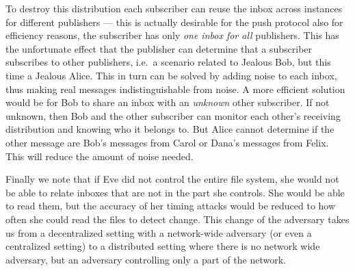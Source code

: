 To destroy this distribution each subscriber can reuse the inbox across 
instances for different publishers --- this is actually desirable for the push 
protocol also for efficiency reasons, the subscriber has only \emph{one inbox 
  for all} publishers.
This has the unfortunate effect that the publisher can determine that 
a subscriber subscribes to other publishers, i.e.\ a scenario related to 
Jealous Bob, but this time a Jealous Alice.
This in turn can be solved by adding noise to each inbox, thus making real 
messages indistinguishable from noise.
A more efficient solution would be for Bob to share an inbox with an 
\emph{unknown} other subscriber.
If not unknown, then Bob and the other subscriber can monitor each other's 
receiving distribution and knowing who it belongs to.
But Alice cannot determine if the other message are Bob's messages from Carol 
or Dana's messages from Felix.
This will reduce the amount of noise needed.

Finally we note that if Eve did not control the entire file system, she would 
not be able to relate inboxes that are not in the part she controls.
She would be able to read them, but the accuracy of her timing attacks would be
reduced to how often she could read the files to detect change.
This change of the adversary takes us from a decentralized setting with 
a network-wide adversary (or even a centralized setting) to a distributed 
setting where there is no network wide adversary, but an adversary controlling 
only a part of the network.

